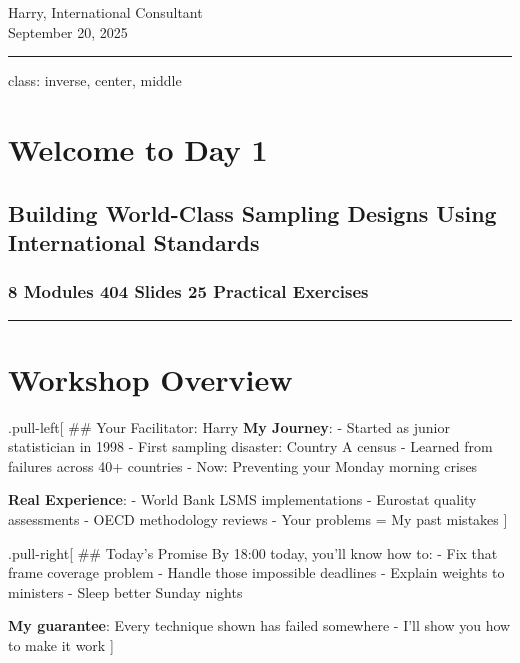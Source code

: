 \documentclass[
]{article}
\begin{document}
Harry, International Consultant\\
September 20, 2025

\begin{center}\rule{0.5\linewidth}{0.5pt}\end{center}

class: inverse, center, middle

\section{Welcome to Day 1}\label{welcome-to-day-1}

\subsection{Building World-Class Sampling Designs Using International
Standards}\label{building-world-class-sampling-designs-using-international-standards}

\subsubsection{8 Modules \textbar{} 404 Slides \textbar{} 25 Practical
Exercises}\label{modules-404-slides-25-practical-exercises}

\begin{center}\rule{0.5\linewidth}{0.5pt}\end{center}

\section{Workshop Overview}\label{workshop-overview}

.pull-left{[} \#\# Your Facilitator: Harry \textbf{My Journey}: -
Started as junior statistician in 1998 - First sampling disaster:
Country A census - Learned from failures across 40+ countries - Now:
Preventing your Monday morning crises

\textbf{Real Experience}: - World Bank LSMS implementations - Eurostat
quality assessments - OECD methodology reviews - Your problems = My past
mistakes {]}

.pull-right{[} \#\# Today's Promise By 18:00 today, you'll know how to:
- Fix that frame coverage problem - Handle those impossible deadlines -
Explain weights to ministers - Sleep better Sunday nights

\textbf{My guarantee}: Every technique shown has failed somewhere - I'll
show you how to make it work {]}
\end{document}

